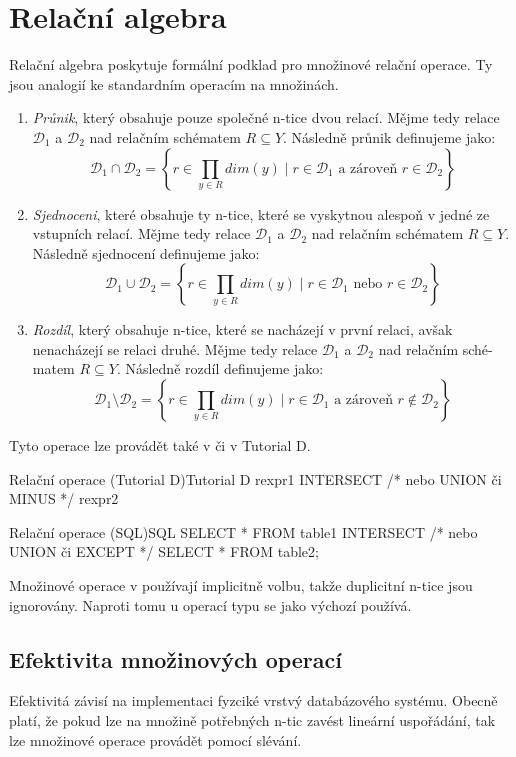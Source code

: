 \section{Relační algebra}
Relační algebra poskytuje formální podklad pro množinové relační operace. Ty jsou analogií ke standardním operacím na množinách.
\begin{enumerate}
\item \textit{Průnik}, který obsahuje pouze společné n-tice dvou relací. Mějme tedy relace $\mathcal{D}_{1}$ a $\mathcal{D}_{2}$ nad relačním schématem $R \subseteq Y$. Následně průnik definujeme jako:
$$
\mathcal{D}_{1} \cap \mathcal{D}_{2} = \left\{ r \in \prod_{y \in R} dim(y) \; | \; r \in \mathcal{D}_{1} \text{ a zároveň } r \in \mathcal{D}_{2} \right\}
$$
\item \textit{Sjednoceni}, které obsahuje ty n-tice, které se vyskytnou alespoň v jedné ze vstupních relací. Mějme tedy relace $\mathcal{D}_{1}$ a $\mathcal{D}_{2}$ nad relačním schématem $R \subseteq Y$. Následně sjednocení definujeme jako:
$$
\mathcal{D}_{1} \cup \mathcal{D}_{2} = \left\{ r \in \prod_{y \in R} dim(y) \; | \; r \in \mathcal{D}_{1} \text{ nebo } r \in \mathcal{D}_{2} \right\}
$$
\item \textit{Rozdíl}, který obsahuje n-tice, které se nacházejí v první relaci, avšak nenacházejí se relaci druhé. Mějme tedy relace $\mathcal{D}_{1}$ a $\mathcal{D}_{2}$ nad relačním sché-matem $R \subseteq Y$. Následně rozdíl definujeme jako:
$$
\mathcal{D}_{1} \setminus \mathcal{D}_{2} = \left\{ r \in \prod_{y \in R} dim(y) \; | \; r \in \mathcal{D}_{1} \text{ a zároveň } r \notin \mathcal{D}_{2} \right\}
$$
\end{enumerate}
Tyto operace lze provádět také v  či v Tutorial D.
\begin{upcode}{Relační operace (Tutorial D)}{}{Tutorial D}
rexpr1 INTERSECT /* nebo UNION či MINUS */ rexpr2
\end{upcode}
\begin{upcode}{Relační operace (SQL)}{}{SQL}
SELECT * FROM table1
	INTERSECT /* nebo UNION či EXCEPT */
SELECT * FROM table2;
\end{upcode}
Množinové operace v  používají implicitně volbu, takže duplicitní n-tice jsou ignorovány. Naproti tomu u operací typu se jako výchozí používá.

\subsection{Efektivita množinových operací}
Efektivitá závisí na implementaci fyzciké vrstvý databázového systému. Obecně platí, že pokud lze na množině potřebných n-tic zavést lineární uspořádání, tak lze množinové operace provádět pomocí slévání.

